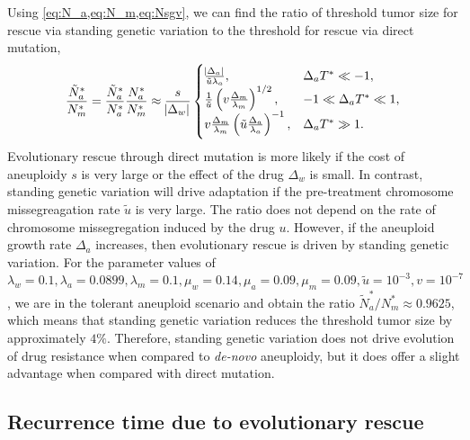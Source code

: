 \documentclass[12pt]{extarticle}
\begin{document}
Using \cref{eq:N_a,eq:N_m,eq:Nsgv}, we can find the ratio of threshold tumor size for rescue via standing genetic variation  to the threshold for rescue via direct mutation,
\begin{equation} \label{eq:N_sgv_ratio}
\frac{\tilde{N}^*_a}{N^*_m}=\frac{\tilde{N}^*_{a}}{N^*_{a}} \frac{N^*_a}{N^*_m} \approx \frac{s}{\abs{\Delta_w}}\begin{cases}
    \frac{\abs{\Delta_a}}{\tilde{u}\lambda_a} ,&
  \Delta_a T^* \ll -1 ,\\ 
  \frac{1}{\tilde{u}}\left(v \frac{\Delta_m}{\lambda_m}\right)^{1/2} ,&
  -1 \ll \Delta_a T^* \ll 1  ,\\ 
  v \frac{\Delta_m}{\lambda_m} \left(\tilde{u}\frac{\Delta_a}{\lambda_a}\right)^{-1}  ,&
   \Delta_a T^* \gg 1 .
  \end{cases}
\end{equation}
Evolutionary rescue through direct mutation is more likely if the cost of aneuploidy $s$ is very large or the effect of the drug $\Delta_w$ is small.  In contrast, standing genetic variation will drive adaptation if the pre-treatment chromosome missegreagation rate $\tilde{u}$ is very large. The ratio does not depend on the rate of chromosome missegregation induced by the drug $u$. However, if the aneuploid growth rate $\Delta_a$ increases, then evolutionary rescue is driven by standing genetic variation. For the parameter values of  $\lambda_w=0.1, \lambda_a=0.0899,\lambda_m=0.1,\mu_w=0.14,\mu_a=0.09,\mu_m=0.09, \tilde{u}=10^{-3}, v=10^{-7}$, we are in the tolerant aneuploid scenario and obtain the ratio $\tilde{N}^*_a/N^*_m \approx 0.9625$, which means that standing genetic variation reduces the threshold tumor size by approximately $4\%$. Therefore, standing genetic variation does not drive evolution of drug resistance when compared to \emph{de-novo} aneuploidy, but it does offer a slight advantage when compared with direct mutation.


\subsection*{Recurrence time due to evolutionary rescue}
\end{document}
